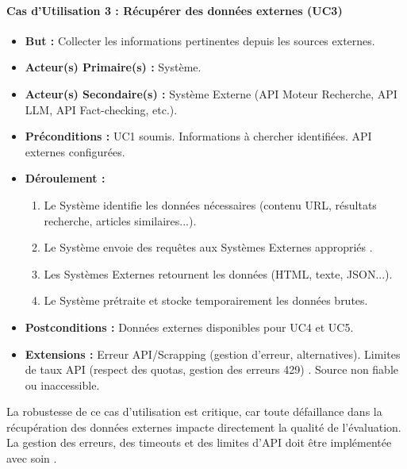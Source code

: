 \documentclass[9pt,twocolumn,french]{article}
\begin{document}
\paragraph{Cas d'Utilisation 3 : Récupérer des données externes (UC3)}
\begin{itemize}
    \item \textbf{But :} Collecter les informations pertinentes depuis les sources externes.
    \item \textbf{Acteur(s) Primaire(s) :} Système.
    \item \textbf{Acteur(s) Secondaire(s) :} Système Externe (API Moteur Recherche, API LLM, API Fact-checking, etc.).
    \item \textbf{Préconditions :} UC1 soumis. Informations à chercher identifiées. API externes configurées.
    \item \textbf{Déroulement  :}
        \begin{enumerate}
            \item Le Système identifie les données nécessaires (contenu URL, résultats recherche, articles similaires...).
            \item Le Système envoie des requêtes aux Systèmes Externes appropriés \citep{GoogleSearchAPI, microsoft_bing, Google2026Fact, schema_claimreview}.
            \item Les Systèmes Externes retournent les données (HTML, texte, JSON...).
            \item Le Système prétraite et stocke temporairement les données brutes.
        \end{enumerate}
    \item \textbf{Postconditions :} Données externes disponibles pour UC4 et UC5.
    \item \textbf{Extensions :} Erreur API/Scrapping (gestion d'erreur, alternatives). Limites de taux API (respect des quotas, gestion des erreurs 429) \citep{GoogleSearchAPI, microsoft_bing}. Source non fiable ou inaccessible.
\end{itemize}
La robustesse de ce cas d'utilisation est critique, car toute défaillance dans la récupération des données externes impacte directement la qualité de l'évaluation. La gestion des erreurs, des timeouts et des limites d'API doit être implémentée avec soin \citep{GoogleSearchAPI, microsoft_bing}.
\end{document}
